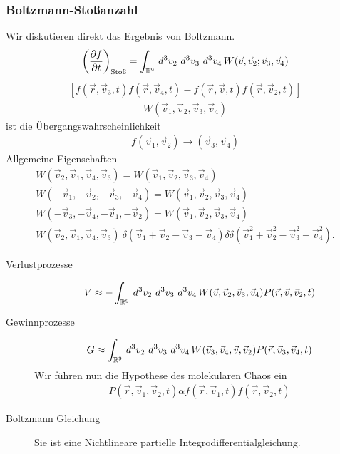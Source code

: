 \subsubsection*{Boltzmann-Stoßanzahl}
Wir diskutieren direkt das Ergebnis von Boltzmann.
%
\begin{align*}
  \left( \frac{\partial f }{\partial t} \right)_\text{Stoß} = \int_{\mathbb{R}^9}^{} \,d^3 v_2\,
  \,d^3 v_3\, \,d^3 v_4\, W(\vec{v}, \vec{v}_2; \vec{v}_3, \vec{v}_4)
\end{align*}
%
%
\begin{align*}
  \left[ f(\vec{r}, \vec{v}_3, t) f(\vec{r}, \vec{v}_4, t) -
  f(\vec{r}, \vec{v}, t) f(\vec{r}, \vec{v}_2, t) \right]
\end{align*}
%
%
\begin{align*}
  W(\vec{v}_1, \vec{v}_2, \vec{v}_3, \vec{v}_4)
\end{align*}
%
ist die Übergangswahrscheinlichkeit
%
\begin{align*}
  f(\vec{v}_1, \vec{v}_2) \xrightarrow{} (\vec{v}_3, \vec{v}_4)
\end{align*}
%
Allgemeine Eigenschaften
%
\begin{align*}
  W(\vec{v}_2, \vec{v}_1, \vec{v}_4, \vec{v}_3) = W(\vec{v}_1, \vec{v}_2, \vec{v}_3, \vec{v}_4) \\
  W(- \vec{v}_1, - \vec{v}_2, - \vec{v}_3, - \vec{v}_4) = W(\vec{v}_1, \vec{v}_2, \vec{v}_3, \vec{v}_4) \\
  W( - \vec{v}_3, - \vec{v}_4, - \vec{v}_1, - \vec{v}_2) = W(\vec{v}_1, \vec{v}_2, \vec{v}_3, \vec{v}_4) \\
  W(\vec{v}_2, \vec{v}_1, \vec{v}_4, \vec{v}_3)  ~
  \delta(\vec{v}_1 + \vec{v}_2 - \vec{v}_3 - \vec{v}_4) \delta
  \delta(\vec{v}_1^2 + \vec{v}_2^2 - \vec{v}_3^2 - \vec{v}_4^2).
\end{align*}
%
%
\begin{description}
  \item[Verlustprozesse]
    \begin{align*}
      V \approx - \int_{\mathbb{R}^9}^{} \,d^3 v_2\, \,d^3 v_3\, \,d^3 v_4\,
      W(\vec{v}, \vec{v}_2, \vec{v}_3, \vec{v}_4) P(\vec{r}, \vec{v}, \vec{v}_2, t)
    \end{align*}
  \item[Gewinnprozesse]
    \begin{align*}
      G \approx \int_{\mathbb{R}^9}^{} \,d^3 v_2\, \,d^3 v_3\, \,d^3 v_4\, W(\vec{v}_3, \vec{v}_4, \vec{v},
      \vec{v}_2) P(\vec{r}, \vec{v}_3, \vec{v}_4, t)
    \end{align*}
    Wir führen nun die Hypothese des molekularen Chaos ein
    \begin{align*}
      P(\vec{r}, \vec{v}_1, \vec{v}_2, t) \alpha f(\vec{r}, \vec{v}_1, t)
      f(\vec{r}, \vec{v}_2, t)
    \end{align*}
  \item[Boltzmann Gleichung]
    Sie ist eine Nichtlineare partielle Integrodifferentialgleichung.
\end{description}
